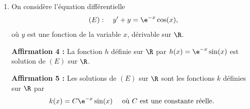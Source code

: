 \begin{enumerate}
\begin{center}
	\end{center}

	\textbf{Affirmation 3:} \quad $P_{B}\big(\,\overline{A}\,\big)=\dfrac{9}{50}$.

	\item On considère l'équation différentielle
	\[(E): \quad y'+y=\e^{-x} \cos (x),\]
	où $y$ est une fonction de la variable $x$, dérivable sur $\R$.

	\textbf{Affirmation 4 :} La fonction $h$ définie sur $\R$ par $h(x)=\e^{-x} \sin (x)$ est solution de $(E)$ sur $\R$.

	\textbf{Affirmation 5 :} Les solutions de $(E)$ sur $\R$ sont les fonctions $k$ définies sur $\R$ par
	\[k(x)=C \e^{-x} \sin (x) \quad\text { où } C \text { est une constante réelle. }\]
\end{enumerate}
